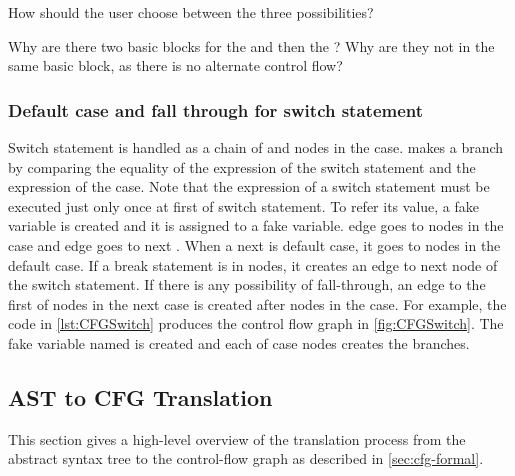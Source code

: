
\begin{workinprogress}
How should the user choose between the three possibilities?
\end{workinprogress}

\begin{workinprogress}
Why are there two basic blocks for the  and then
the ? Why are they not in the same basic block, as there
is no alternate control flow?
\end{workinprogress}

\subsubsection{Default case and fall through for switch statement}
\label{sec:default-switch}
Switch statement is handled as a chain of  and nodes in
the case.  makes a branch by comparing the equality of
the expression of the switch statement and the expression of the case.
Note that the expression of a switch statement must be executed just only
once at first of switch statement. To refer its value, a fake variable
is created and it is assigned to a fake variable. 
edge goes to nodes in the case and  edge goes to next
. When a next is default case, it goes to nodes in the default
case. If a break statement is in nodes, it creates an edge to next node of
the switch statement. If there is any possibility of fall-through, an edge
to the first of nodes in the next case is created after nodes in the case.
For example, the code in \autoref{lst:CFGSwitch} produces the control flow
graph in \autoref{fig:CFGSwitch}. The fake variable named 
is created and each of case nodes creates the branches.


\subsection{AST to CFG Translation}
\label{sec:ast_to_cfg_translation}

This section gives a high-level overview of the translation process
from the abstract syntax tree to the control-flow graph as described
in \autoref{sec:cfg-formal}.

